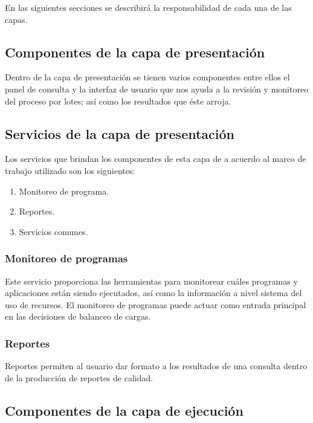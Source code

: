 En las siguientes secciones se describirá la responsabilidad de cada una de las
capas.

\subsection{Componentes de la capa de presentación}

Dentro de la capa de presentación se tienen varios componentes entre ellos el
panel de consulta y la interfaz de usuario que nos ayuda a la revisión y
monitoreo del proceso por lotes; así como los resultados que éste arroja.

\subsection{Servicios de la capa de presentación}

Los servicios que brindan los componentes de esta capa de a acuerdo al marco de
trabajo utilizado son los siguientes:

\begin{enumerate}
\item Monitoreo de programa.
\item Reportes.
\item Servicios comunes.
\end{enumerate}

\subsubsection{Monitoreo de programas}

Este servicio proporciona las herramientas para monitorear cuáles programas y
aplicaciones están siendo ejecutados, así como la información a nivel sistema
del uso de recursos. El monitoreo de programas puede actuar como entrada
principal en las decisiones de balanceo de cargas.

\subsubsection{Reportes}

Reportes permiten al usuario dar formato a los resultados de una consulta dentro
de la producción de reportes de calidad.

\subsection{Componentes de la capa de ejecución}


